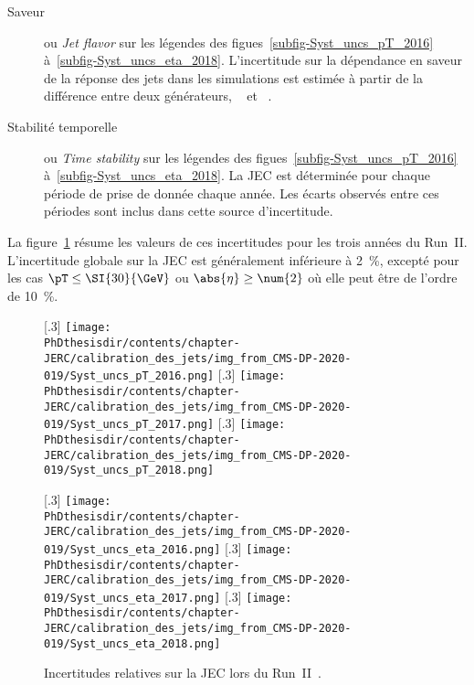 \begin{description}
\item[Saveur] ou \emph{Jet flavor} sur les légendes des figues~\ref{subfig-Syst_uncs_pT_2016} à~\ref{subfig-Syst_uncs_eta_2018}.
L'incertitude sur la dépendance en saveur de la réponse des jets dans les simulations est estimée à partir de la différence entre deux générateurs,
\PYTHIA~\cite{pythia6.4}
et
\HERWIG~\cite{herwig}.
\item[Stabilité temporelle] ou \emph{Time stability} sur les légendes des figues~\ref{subfig-Syst_uncs_pT_2016} à~\ref{subfig-Syst_uncs_eta_2018}.
La JEC est déterminée pour chaque période de prise de donnée chaque année. Les écarts observés entre ces périodes sont inclus dans cette source d'incertitude.
\end{description}
La figure~\ref{fig-Syst_uncs_JEC_RunII} résume les valeurs de ces incertitudes pour les trois années du Run~II.
L'incertitude globale sur la JEC est généralement inférieure à \SI{2}{\%}, excepté pour les cas $\pT\leq\SI{30}{\GeV}$ ou $\abs{\eta}\geq\num{2}$ où elle peut être de l'ordre de \SI{10}{\%}.
\begin{figure}[h]
\centering
{}[.3\textwidth]
{\texttt{[image: \\PhDthesisdir/contents/chapter-JERC/calibration\_des\_jets/img\_from\_CMS-DP-2020-019/Syst\_uncs\_pT\_2016.png]}}
\hfill
{}[.3\textwidth]
{\texttt{[image: \\PhDthesisdir/contents/chapter-JERC/calibration\_des\_jets/img\_from\_CMS-DP-2020-019/Syst\_uncs\_pT\_2017.png]}}
\hfill
{}[.3\textwidth]
{\texttt{[image: \\PhDthesisdir/contents/chapter-JERC/calibration\_des\_jets/img\_from\_CMS-DP-2020-019/Syst\_uncs\_pT\_2018.png]}}

\vspace{\baselineskip}

[.3\textwidth]
{\texttt{[image: \\PhDthesisdir/contents/chapter-JERC/calibration\_des\_jets/img\_from\_CMS-DP-2020-019/Syst\_uncs\_eta\_2016.png]}}
\hfill
{}[.3\textwidth]
{\texttt{[image: \\PhDthesisdir/contents/chapter-JERC/calibration\_des\_jets/img\_from\_CMS-DP-2020-019/Syst\_uncs\_eta\_2017.png]}}
\hfill
{}[.3\textwidth]
{\texttt{[image: \\PhDthesisdir/contents/chapter-JERC/calibration\_des\_jets/img\_from\_CMS-DP-2020-019/Syst\_uncs\_eta\_2018.png]}}

\caption[Incertitudes relatives sur la JEC en fonction de \pT\ et $\eta$ lors du Run~II.]{Incertitudes relatives sur la JEC lors du Run~II~\cite{CMS-DP-2020-019}.}
\label{fig-Syst_uncs_JEC_RunII}
\end{figure}
